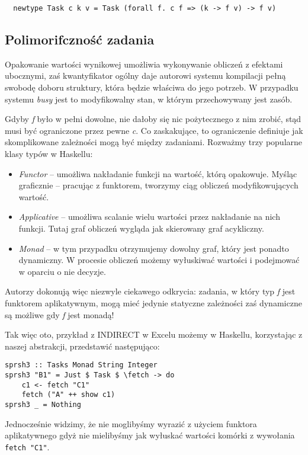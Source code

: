 \begin{lstlisting}
  newtype Task c k v = Task (forall f. c f => (k -> f v) -> f v)
\end{lstlisting}

\subsection{Polimorifczność zadania}

Opakowanie wartości wynikowej umożliwia wykonywanie obliczeń z efektami ubocznymi, zaś kwantyfikator ogólny daje autorowi systemu kompilacji pełną swobodę doboru struktury, która będzie właściwa do jego potrzeb. W przypadku systemu \textit{busy} jest to modyfikowalny stan, w którym przechowywany jest zasób.

Gdyby \textit{f} było w pełni dowolne, nie dałoby się nic pożytecznego z nim zrobić, stąd musi być ograniczone przez pewne \textit{c}. Co zaskakujące, to ograniczenie definiuje jak skomplikowane zależności mogą być między zadaniami. Rozważmy trzy popularne klasy typów w Haskellu:
\begin{itemize}
\item \textit{Functor} -- umożliwa nakładanie funkcji na wartość, którą opakowuje. Myśląc graficznie -- pracując z funktorem, tworzymy ciąg obliczeń modyfikowujących wartość.
\item \textit{Applicative} -- umożliwa scalanie wielu wartości przez nakładanie na nich funkcji. Tutaj graf obliczeń wygląda jak skierowany graf acykliczny.
\item \textit{Monad} -- w tym przypadku otrzymujemy dowolny graf, który jest ponadto dynamiczny. W procesie obliczeń możemy wyłuskiwać wartości i podejmować w oparciu o nie decyzje.
\end{itemize}

Autorzy dokonują więc niezwyle ciekawego odkrycia: zadania, w który typ \textit{f} jest funktorem aplikatywnym, mogą mieć jedynie statyczne zależności zaś dynamiczne są możliwe gdy \textit{f} jest monadą!

Tak więc oto, przykład z INDIRECT w Excelu możemy w Haskellu, korzystając z naszej abstrakcji, przedstawić następująco:

\begin{lstlisting}
sprsh3 :: Tasks Monad String Integer
sprsh3 "B1" = Just $ Task $ \fetch -> do
    c1 <- fetch "C1"
    fetch ("A" ++ show c1)
sprsh3 _ = Nothing
\end{lstlisting}

Jednocześnie widzimy, że nie moglibyśmy wyrazić z użyciem funktora aplikatywnego gdyż nie mielibyśmy jak wyłuskać wartości komórki z wywołania \lstinline{fetch "C1"}.

